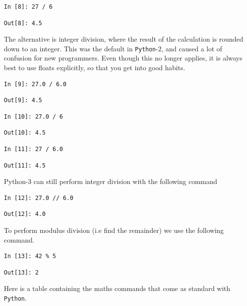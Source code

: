 \begin{lstlisting}[style=PY]
In [8]: 27 / 6
\end{lstlisting}
\begin{lstlisting}[style=PY, backgroundcolor=\color{white}]
Out[8]: 4.5
\end{lstlisting}
 The alternative is integer division, where the result of the calculation is rounded down to an integer. This was the default in \texttt{Python}-2, and caused a lot of confusion for new programmers. Even though this no longer applies, it is always best to use floats explicitly, so that you get into good habits.
\begin{lstlisting}[style=PY]
In [9]: 27.0 / 6.0
\end{lstlisting}
\begin{lstlisting}[style=PY, backgroundcolor=\color{white}]
Out[9]: 4.5
\end{lstlisting}
\begin{lstlisting}[style=PY]
In [10]: 27.0 / 6
\end{lstlisting}
\begin{lstlisting}[style=PY, backgroundcolor=\color{white}]
Out[10]: 4.5
\end{lstlisting}
\begin{lstlisting}[style=PY]
In [11]: 27 / 6.0
\end{lstlisting}
\begin{lstlisting}[style=PY, backgroundcolor=\color{white}]
Out[11]: 4.5 
\end{lstlisting}
Python-3 can still perform integer division with the following command 
\begin{lstlisting}[style=PY]
In [12]: 27.0 // 6.0
\end{lstlisting}
\begin{lstlisting}[style=PY, backgroundcolor=\color{white}]
Out[12]: 4.0
\end{lstlisting}
\noindent To perform modulus division (i.e find the remainder) we use the following command.
\begin{lstlisting}[style=PY]
In [13]: 42 % 5
\end{lstlisting}
\begin{lstlisting}[style=PY, backgroundcolor=\color{white}]
Out[13]: 2
\end{lstlisting}
\noindent Here is a table containing the maths commands that come as standard with \texttt{Python}.
